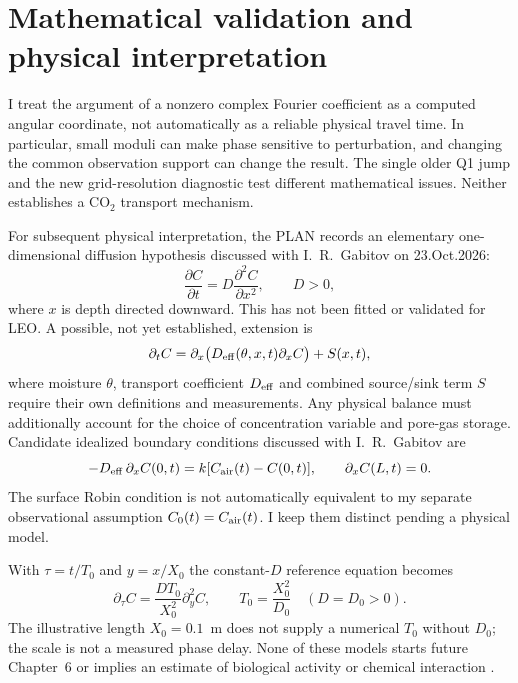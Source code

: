 \documentclass[11pt,letterpaper]{article}
\begin{document}
\section{Mathematical validation and physical interpretation}
\label{sec:validation}
I treat the argument of a nonzero complex Fourier
coefficient as a computed angular coordinate, not
automatically as a reliable physical travel time.
In particular, small moduli can make phase sensitive
to perturbation, and changing the common observation
support can change the result. The single older Q1
jump and the new grid-resolution diagnostic test
different mathematical issues. Neither establishes
a CO$_2$ transport mechanism.

For subsequent physical interpretation, the PLAN
records an elementary one-dimensional diffusion
hypothesis discussed with I.~R.~Gabitov on
23.Oct.2026:
\begin{equation}
\frac{\partial C}{\partial t}
=D\frac{\partial^2 C}{\partial x^2},\qquad D>0,
\label{eq:diffusion}
\end{equation}
where $x$ is depth directed downward.
This has not been fitted or validated for LEO.
A possible, not yet established, extension is
\begin{equation}
\partial_t C=
\partial_x\bigl(D_{\rm eff}(\theta,x,t)\partial_xC\bigr)
+S(x,t),
\label{eq:diffusionwet}
\end{equation}
where moisture $\theta$, transport coefficient
$D_{\rm eff}$ and combined source/sink term $S$
require their own definitions and measurements.
Any physical balance must additionally account for
the choice of concentration variable and pore-gas
storage. Candidate idealized boundary conditions
discussed with I.~R.~Gabitov are
\begin{equation}
-D_{\rm eff}\,\partial_x C(0,t)
=k[C_{\rm air}(t)-C(0,t)],\qquad
\partial_x C(L,t)=0.
\label{eq:bc}
\end{equation}
The surface Robin condition is not automatically
equivalent to my separate observational assumption
$C_0(t)=C_{\rm air}(t)$.
I keep them distinct pending a physical model.

With $\tau=t/T_0$ and $y=x/X_0$ the constant-$D$
reference equation becomes
\begin{equation}
\partial_\tau C=
\frac{DT_0}{X_0^2}\partial_y^2C,\qquad
T_0=\frac{X_0^2}{D_0}\quad(D=D_0>0).
\label{eq:scale}
\end{equation}
The illustrative length $X_0=0.1$~m
does not supply a numerical $T_0$ without $D_0$;
the scale is not a measured phase delay.
None of these models starts future Chapter~6
or implies an estimate of biological activity
or chemical interaction \cite{plan,maier}.
\end{document}
